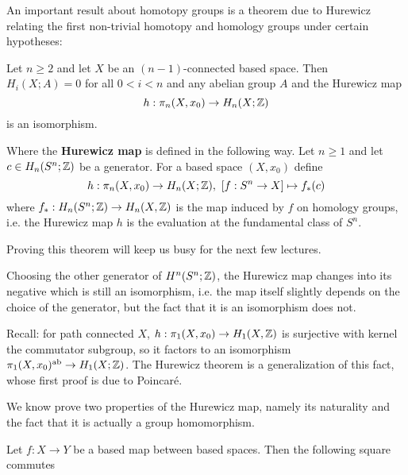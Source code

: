 An important result about homotopy groups is a theorem due to Hurewicz relating the first non-trivial homotopy and homology groups under certain hypotheses:

\begin{theorem}[Hurewicz]\label{theorem:absolute-hurewicz}
Let $n\geq2$ and let $X$ be an $(n-1)$-connected based space. Then $H_i(X;A)=0$ for all $0<i<n$ and any abelian group $A$ and the Hurewicz map
\[h:\pi_n(X,x_0)\to H_n(X;{\mathbb Z})\]
is an isomorphism.
\end{theorem}

Where the \textbf{Hurewicz map} is defined in the following way. Let $n\geq1$ and let $c\in H_n(S^n;{\mathbb Z})$ be a generator. For a based space $(X,x_0)$ define
\[h:\pi_n(X,x_0)\to H_n(X;\Z),\ [f:S^n\to X]\mapsto f_*(c)\]
where $f_*:H_n(S^n;{\mathbb Z})\to H_n(X,{\mathbb Z})$ is the map induced by $f$ on homology groups, i.e. the Hurewicz map $h$ is the evaluation at the fundamental class of $S^n$.

Proving this theorem will keep us busy for the next few lectures.

\begin{remark}
Choosing the other generator of $H^n(S^n;{\mathbb Z})$, the Hurewicz map changes into its negative which is still an isomorphism, i.e. the map itself slightly depends on the choice of the generator, but the fact that it is an isomorphism does not.
\end{remark}

\begin{remark}
Recall: for path connected $X$, $h:\pi_1(X,x_0)\to H_1(X,{\mathbb Z})$ is surjective with kernel the commutator subgroup, so it factors to an isomorphism $\pi_1(X,x_0)^{\text{ab}}\to H_1(X;{\mathbb Z})$. The Hurewicz theorem is a generalization of this fact, whose first proof is due to Poincaré.
\end{remark}

We know prove two properties of the Hurewicz map, namely its naturality and the fact that it is actually a group homomorphism.

 Let $f:X\to Y$ be a based map between based spaces. Then the following square commutes
\begin{center}
\end{center}

